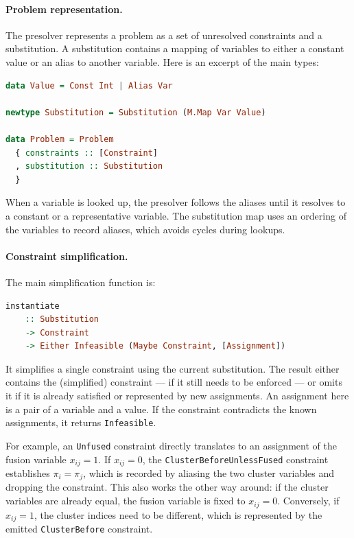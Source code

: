 \paragraph{Problem representation.}

The presolver represents a problem as a set of unresolved constraints and a substitution.
A substitution contains a mapping of variables to either a constant value or an alias to another variable.
Here is an excerpt of the main types:

\begin{lstlisting}[language=Haskell]
data Value = Const Int | Alias Var

newtype Substitution = Substitution (M.Map Var Value)

data Problem = Problem
  { constraints :: [Constraint]
  , substitution :: Substitution
  }
\end{lstlisting}

When a variable is looked up, the presolver follows the aliases until it resolves to a constant or a representative variable.
The substitution map uses an ordering of the variables to record aliases, which avoids cycles during lookups.

\paragraph{Constraint simplification.}

The main simplification function is:
\begin{lstlisting}[language=Haskell]
instantiate
    :: Substitution
    -> Constraint
    -> Either Infeasible (Maybe Constraint, [Assignment])
\end{lstlisting}

It simplifies a single constraint using the current substitution.
The result either contains the (simplified) constraint --- if it still needs to be enforced --- or omits it if it is already satisfied or represented by new assignments.
An assignment here is a pair of a variable and a value.
If the constraint contradicts the known assignments, it returns \texttt{Infeasible}.

For example, an \texttt{Unfused} constraint directly translates to an assignment of the fusion variable $x_{ij} = 1$.
If $x_{ij} = 0$, the \texttt{ClusterBeforeUnlessFused} constraint establishes $\pi_i = \pi_j$, which is recorded by aliasing the two cluster variables and dropping the constraint.
This also works the other way around: if the cluster variables are already equal, the fusion variable is fixed to $x_{ij} = 0$.
Conversely, if $x_{ij} = 1$, the cluster indices need to be different, which is represented by the emitted \texttt{ClusterBefore} constraint.

